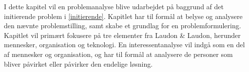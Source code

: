 I dette kapitel vil en problemanalyse blive udarbejdet på baggrund af det initierende problem i \cref{initierende}. Kapitlet har til formål at belyse og analysere den nævnte problemstilling, samt skabe et grundlag for en problemformulering. Kapitlet vil primært fokusere på tre elementer fra Laudon \& Laudon, herunder mennesker, organisation og teknologi. En interessentanalyse vil indgå som en del af mennesker og organisation, og har til formål at analysere de personer som bliver påvirket eller påvirker den endelige løsning.